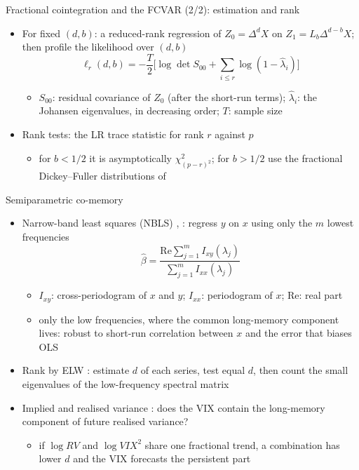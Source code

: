 \begin{frame}{Fractional cointegration and the FCVAR (2/2): estimation and rank}
\itemsize{\small}
\begin{itemize}
    \item For fixed $(d, b)$: a reduced-rank regression of $Z_0 = \Delta^dX$ on $Z_1 = L_b\Delta^{d-b}X$; then profile the likelihood over $(d, b)$
    \[ \ell_r(d, b) = -\frac T2\Big[\log\det S_{00} + \sum_{i\le r}\log(1 - \hat\lambda_i)\Big] \]
    \begin{itemize}
        \item $S_{00}$: residual covariance of $Z_0$ (after the short-run terms); $\hat\lambda_i$: the Johansen eigenvalues, in decreasing order; $T$: sample size
    \end{itemize}
    \item Rank tests: the LR trace statistic for rank $r$ against $p$
    \begin{itemize}
        \item for $b < 1/2$ it is asymptotically $\chi^2_{(p-r)^2}$; for $b > 1/2$ use the fractional Dickey--Fuller distributions of 
    \end{itemize}
\end{itemize}
\end{frame}

\begin{frame}{Semiparametric co-memory}
\itemsize{\small}
\begin{itemize}
    \item Narrow-band least squares (NBLS) , : regress $y$ on $x$ using only the $m$ lowest frequencies
    \[ \hat\beta = \frac{\mathrm{Re}\sum_{j=1}^mI_{xy}(\lambda_j)}{\sum_{j=1}^mI_{xx}(\lambda_j)} \]
    \begin{itemize}
        \item $I_{xy}$: cross-periodogram of $x$ and $y$; $I_{xx}$: periodogram of $x$; $\mathrm{Re}$: real part
        \item only the low frequencies, where the common long-memory component lives: robust to short-run correlation between $x$ and the error that biases OLS
    \end{itemize}
    \item Rank by ELW : estimate $d$ of each series, test equal $d$, then count the small eigenvalues of the low-frequency spectral matrix
    \item Implied and realised variance : does the VIX contain the long-memory component of future realised variance?
    \begin{itemize}
        \item if $\log RV$ and $\log VIX^2$ share one fractional trend, a combination has lower $d$ and the VIX forecasts the persistent part
    \end{itemize}
\end{itemize}
\end{frame}

